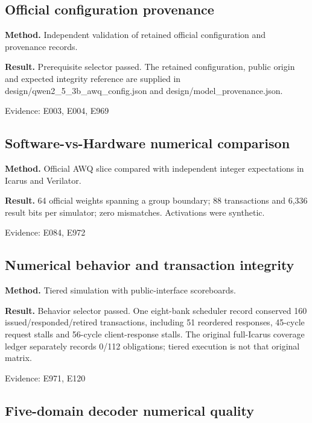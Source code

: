 \documentclass[11pt,a4paper]{article}
\begin{document}
\subsection{Official configuration provenance}

\textbf{Method.} Independent validation of retained official configuration and provenance records.

\textbf{Result.} Prerequisite selector passed. The retained configuration,\allowbreak{} public origin and expected integrity reference are supplied in design/\allowbreak{}qwen2\_\allowbreak{}5\_\allowbreak{}3b\_\allowbreak{}awq\_\allowbreak{}config.json and design/\allowbreak{}model\_\allowbreak{}provenance.json.

{\small Evidence: E003,\allowbreak{} E004,\allowbreak{} E969}

\subsection{Software-vs-Hardware numerical comparison}

\textbf{Method.} Official AWQ slice compared with independent integer expectations in Icarus and Verilator.

\textbf{Result.} 64 official weights spanning a group boundary; 88 transactions and 6,\allowbreak{}336 result bits per simulator; zero mismatches. Activations were synthetic.

{\small Evidence: E084,\allowbreak{} E972}

\subsection{Numerical behavior and transaction integrity}

\textbf{Method.} Tiered simulation with public-interface scoreboards.

\textbf{Result.} Behavior selector passed. One eight-bank scheduler record conserved 160 issued/\allowbreak{}responded/\allowbreak{}retired transactions,\allowbreak{} including 51 reordered responses,\allowbreak{} 45-cycle request stalls and 56-cycle client-response stalls. The original full-Icarus coverage ledger separately records 0/\allowbreak{}112 obligations; tiered execution is not that original matrix.

{\small Evidence: E971,\allowbreak{} E120}

\subsection{Five-domain decoder numerical quality}
\end{document}
